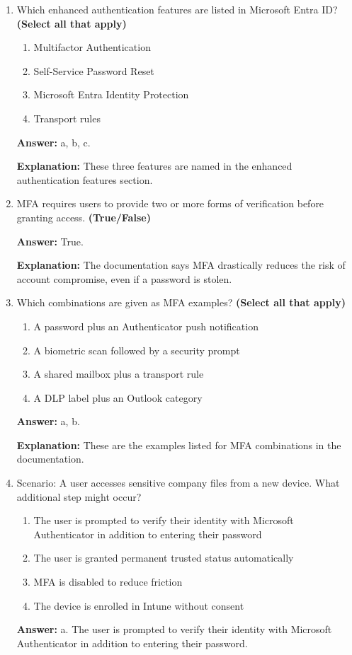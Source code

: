 \documentclass[10pt]{article}
\begin{document}
\begin{enumerate}[leftmargin=*]
\item Which enhanced authentication features are listed in Microsoft Entra ID? \textbf{(Select all that apply)}
\begin{enumerate}[label=\alph*., leftmargin=1.5em]
\item Multifactor Authentication
\item Self-Service Password Reset
\item Microsoft Entra Identity Protection
\item Transport rules
\end{enumerate}
\textbf{Answer:} a, b, c.

\textbf{Explanation:} These three features are named in the enhanced authentication features section.

\item MFA requires users to provide two or more forms of verification before granting access. \textbf{(True/False)}

\textbf{Answer:} True.

\textbf{Explanation:} The documentation says MFA drastically reduces the risk of account compromise, even if a password is stolen.

\item Which combinations are given as MFA examples? \textbf{(Select all that apply)}
\begin{enumerate}[label=\alph*., leftmargin=1.5em]
\item A password plus an Authenticator push notification
\item A biometric scan followed by a security prompt
\item A shared mailbox plus a transport rule
\item A DLP label plus an Outlook category
\end{enumerate}
\textbf{Answer:} a, b.

\textbf{Explanation:} These are the examples listed for MFA combinations in the documentation.

\item Scenario: A user accesses sensitive company files from a new device. What additional step might occur?
\begin{enumerate}[label=\alph*., leftmargin=1.5em]
\item The user is prompted to verify their identity with Microsoft Authenticator in addition to entering their password
\item The user is granted permanent trusted status automatically
\item MFA is disabled to reduce friction
\item The device is enrolled in Intune without consent
\end{enumerate}
\textbf{Answer:} a. The user is prompted to verify their identity with Microsoft Authenticator in addition to entering their password.


\end{enumerate}
\end{document}
